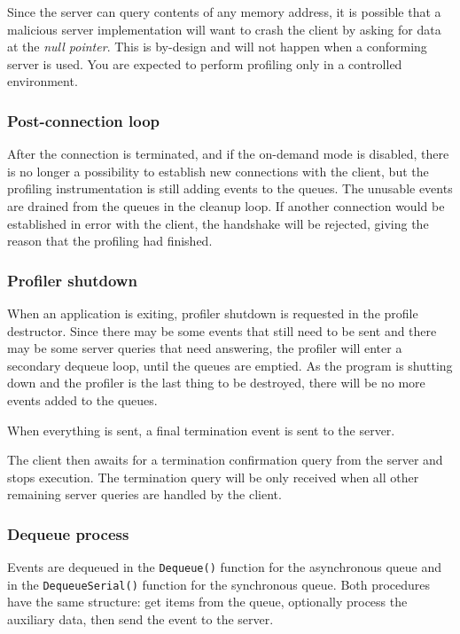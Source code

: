 \documentclass[hidelinks,titlepage,a4paper]{article}
\begin{document}
Since the server can query contents of any memory address, it is possible that a malicious server implementation will want to crash the client by asking for data at the \emph{null pointer}. This is by-design and will not happen when a conforming server is used. You are expected to perform profiling only in a controlled environment.

\subsubsection{Post-connection loop}

After the connection is terminated, and if the on-demand mode is disabled, there is no longer a possibility to establish new connections with the client, but the profiling instrumentation is still adding events to the queues. The unusable events are drained from the queues in the cleanup loop. If another connection would be established in error with the client, the handshake will be rejected, giving the reason that the profiling had finished.

\subsubsection{Profiler shutdown}
\label{shutdown}

When an application is exiting, profiler shutdown is requested in the profile destructor. Since there may be some events that still need to be sent and there may be some server queries that need answering, the profiler will enter a secondary dequeue loop, until the queues are emptied. As the program is shutting down and the profiler is the last thing to be destroyed, there will be no more events added to the queues.

When everything is sent, a final termination event is sent to the server.

The client then awaits for a termination confirmation query from the server and stops execution. The termination query will be only received when all other remaining server queries are handled by the client.

\subsubsection{Dequeue process}
\label{dequeue}

Events are dequeued in the \texttt{Dequeue()} function for the asynchronous queue and in the \texttt{DequeueSerial()} function for the synchronous queue. Both procedures have the same structure: get items from the queue, optionally process the auxiliary data, then send the event to the server.
\end{document}
